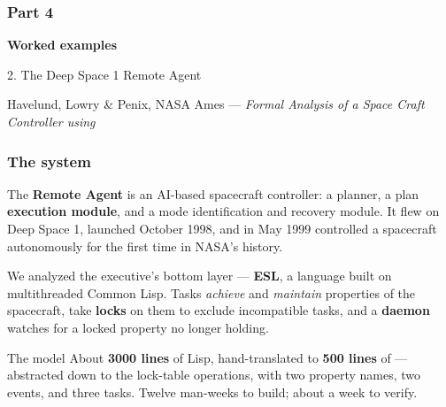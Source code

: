 \begin{frame}
  \frametitle{Part 4}

{\Large\bf Worked examples}

\vspace{0.5cm}

{\large 2. The Deep Space 1 Remote Agent}

\vspace{0.25cm}

{\small Havelund, Lowry \& Penix, NASA Ames --- {\em Formal Analysis of a Space
Craft Controller using \spin{}}}

\end{frame}

\begin{frame}
  \frametitle{The system} \small

The {\bf Remote Agent} is an AI-based spacecraft controller: a planner, a plan
{\bf execution module}, and a mode identification and recovery module. It flew on
Deep Space 1, launched October 1998, and in May 1999 controlled a spacecraft
autonomously for the first time in NASA's history.

\pause
\vspace{0.3cm}

We analyzed the executive's bottom layer --- {\bf ESL}, a language built on
multithreaded Common Lisp. Tasks {\em achieve} and {\em maintain} properties of
the spacecraft, take {\bf locks} on them to exclude incompatible tasks, and a
{\bf daemon} watches for a locked property no longer holding.

\pause
\vspace{0.3cm}

\begin{block}{The model}\small
About {\bf 3000 lines} of Lisp, hand-translated to {\bf 500 lines} of
\promelaname{} --- abstracted down to the lock-table operations, with two
property names, two events, and three tasks. Twelve man-weeks to build; about a
week to verify.
\end{block}

\end{frame}

